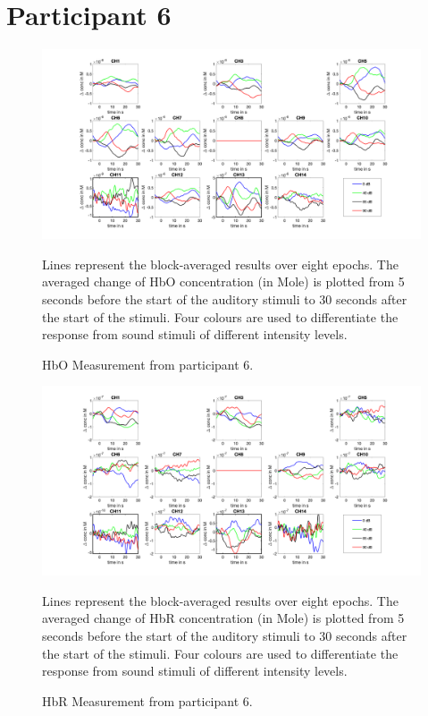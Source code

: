 \section {Participant 6}
\begin{figure}[H]
  \centering
    \includegraphics[scale=.4]{bilder/HbO_Mole/sub_shelia_s_HbO.png}
  \caption{HbO Measurement from participant 6.}
  \label{fig:somesignal}
  \medskip
  \footnotesize {Lines represent the block-averaged results over eight epochs. The averaged change of HbO concentration (in Mole) is plotted from 5 seconds before the start of the auditory stimuli to 30 seconds after the start of the stimuli. Four colours are used to differentiate the response from sound stimuli of different intensity levels.}
\end{figure}


\newpage


\begin{figure}[H]
  \centering
    \includegraphics[scale=.4]{bilder/HbR_Mole/sub_shelia_s_HbR.png}
  \caption{HbR Measurement from participant 6.}
  \label{fig:somesignal}
  \medskip
  \footnotesize {Lines represent the block-averaged results over eight epochs. The averaged change of HbR concentration (in Mole) is plotted from 5 seconds before the start of the auditory stimuli to 30 seconds after the start of the stimuli. Four colours are used to differentiate the response from sound stimuli of different intensity levels.}
\end{figure}

